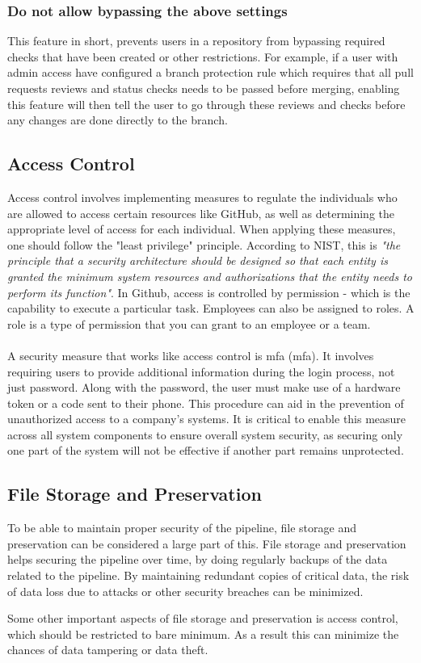 \subsubsection{Do not allow bypassing the above settings}
This feature in short, prevents users in a repository from bypassing required checks that have been created or other restrictions. For example, if a user with admin access have configured a branch protection rule which requires that all pull requests reviews and status checks needs to be passed before merging, enabling this feature will then tell the user to go through these reviews and checks before any changes are done directly to the branch. 
\newpage

\subsection{Access Control}
Access control involves implementing measures to regulate the individuals who are allowed to access certain resources like GitHub, as well as determining the appropriate level of access for each individual. When applying these measures, one should follow the "least privilege" principle. According to NIST, this is \textit{"the principle that a security architecture should be designed so that each entity is granted the minimum system resources and authorizations that the entity needs to perform its function"}\cite{leastprivilege}. In Github, access is controlled by permission - which is the capability to execute a particular task. Employees can also be assigned to roles. A role is a type of permission that you can grant to an employee or a team. \cite{accesscontroll}
\\~\\
A security measure that works like access control is \acrlong{mfa} (\acrshort{mfa}). It involves requiring users to provide additional information during the login process, not just password. Along with the password, the user must make use of a hardware token or a code sent to their phone. 
This procedure can aid in the prevention of unauthorized access to a company's systems. It is critical to enable this measure across all system components to ensure overall system security, as securing only one part of the system will not be effective if another part remains unprotected. 

 
\subsection{File Storage and Preservation}
To be able to maintain proper security of the pipeline, file storage and preservation can be considered a large part of this. File storage and preservation helps securing the pipeline over time, by doing regularly backups of the data related to the pipeline. By maintaining redundant copies of critical data, the risk of data loss due to attacks or other security breaches can be minimized. 

Some other important aspects of file storage and preservation is access control, which should be restricted to bare minimum. As a result this can minimize the chances of data tampering or data theft. 


